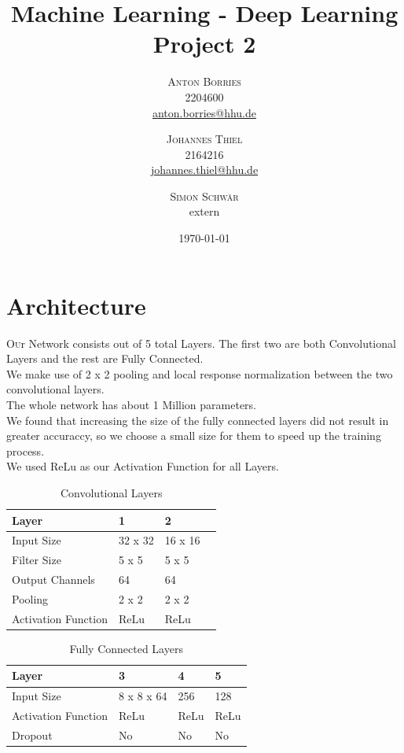 \documentclass[twoside, twocolumn]{article}
\title{Machine Learning - Deep Learning Project 2} %
\author{%
\textsc{Anton Borries} \\[1ex] 
\normalsize 2204600 \\
\normalsize  \href{mailto:anton.borries@hhu.de}{anton.borries@hhu.de}
\and 
\textsc{Johannes Thiel} \\[1ex]
\normalsize 2164216 \\ 
\normalsize \href{mailto:johannes.thiel@hhu.de}{johannes.thiel@hhu.de} 
\and
\textsc{Simon Schw\"ar} \\[1ex]
\normalsize extern \\ 
}
\date{\today} %
\begin{document}
\maketitle


\section{Architecture}

\lettrine[nindent=.2em,lines=2]{O} ur Network consists out of 5 total Layers. The first two are both Convolutional Layers and the rest are Fully Connected. \\
We make use of 2 x 2 pooling and local response normalization between the two convolutional layers. \\
The whole network has about 1 Million parameters. \\
We found that increasing the size of the fully connected layers did not result in greater accuraccy, so we choose a small size for them to speed up the training process. \\
We used ReLu as our Activation Function for all Layers.

\begin{table}[htb]
\label{table_conv}
	\caption{Convolutional Layers}
	\centering
		\begin{tabular}{l l l l}
			Layer & 1 & 2 \\
			\midrule
			Input Size & 32 x 32 & 16 x 16 \\
			Filter Size & 5 x 5 & 5 x 5 \\
			Output Channels & 64 & 64 \\
			Pooling & 2 x 2 & 2 x 2 \\
			Activation Function & ReLu & ReLu \\
\end{tabular}
\end{table}

\begin{table}[htb]
\label{table_fcl}
	\caption{Fully Connected Layers}
	\centering
		\begin{tabular}{l l l l}
			Layer & 3 & 4 & 5\\
			\midrule
			Input Size & 8 x 8 x 64 & 256 & 128 \\
			Activation Function & ReLu & ReLu & ReLu \\
			Dropout & No & No & No\\
\end{tabular}
\end{table}
\end{document}
